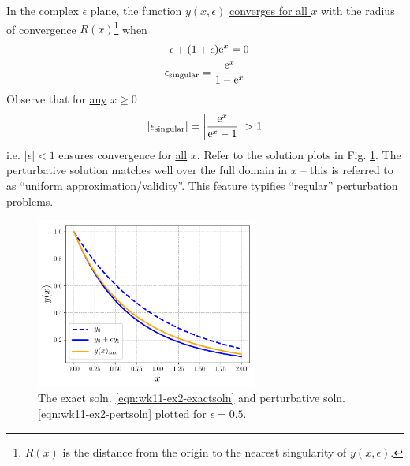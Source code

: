 In the complex $\epsilon$ plane, the function $y(x,\epsilon)$ \underline{converges for all $x$} with the radius of convergence $R(x)$\footnote{$R(x)$ is the distance from the origin to the nearest singularity of $y(x,\epsilon)$.} when
\begin{gather*}
	-\epsilon + (1+\epsilon)\mathrm{e}^x = 0 \\
	\epsilon_\mathrm{singular} = \frac{\mathrm{e}^x}{1 - \mathrm{e}^x}
\end{gather*}
Observe that for \underline{any} $x \geq 0$
\begin{gather*}
	|\epsilon_\mathrm{singular}| = \left| \frac{\mathrm{e}^x}{\mathrm{e}^x-1} \right| > 1
\end{gather*}
i.e. $|\epsilon|<1$ ensures convergence for \underline{all} $x$. Refer to the solution plots in Fig. \ref{fig:strogatz-wk11-ex2}. The perturbative solution matches well over the full domain in $x$ -- this is referred to as ``uniform approximation/validity''. This feature typifies ``regular'' perturbation problems.
\begin{figure}[!h]
	\centering
	\includegraphics[width=0.65\textwidth]{./plots/pdf/strogatz-wk11-ex2.pdf}
	\caption{The exact soln. \ref{eqn:wk11-ex2-exactsoln} and perturbative soln. \ref{eqn:wk11-ex2-pertsoln} plotted for $\epsilon = 0.5$.}
	\label{fig:strogatz-wk11-ex2}
\end{figure}

